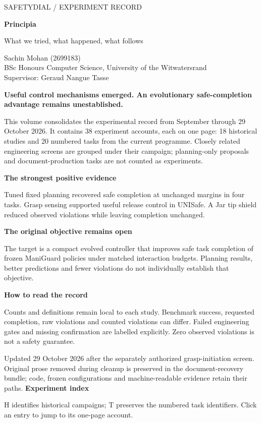 \documentclass[11pt,a4paper]{article}
\newcommand{\block}[2]{\par\textbf{\color{ink}#1}\par\nopagebreak #2\par}
\newcommand{\finding}[1]{\begin{tcolorbox}[colback=pale,colframe=pale,boxrule=0pt,arc=1mm,left=10pt,right=10pt,top=10pt,bottom=10pt]\color{ink}\large\bfseries #1\end{tcolorbox}}
\begin{document}
\thispagestyle{empty}
{\color{accent}\large SAFETYDIAL / EXPERIMENT RECORD}\par
\vspace{13mm}
{\color{ink}\fontsize{44}{48}\selectfont\bfseries Principia}\par
\vspace{3mm}
{\color{ink}\Large What we tried, what happened, what follows}\par
\vspace{8mm}
Sachin Mohan (2699183)\\
BSc Honours Computer Science, University of the Witwatersrand\\
Supervisor: Geraud Nangue Tasse
\vspace{8mm}
\finding{Useful control mechanisms emerged. An evolutionary safe-completion advantage remains unestablished.}
This volume consolidates the experimental record from September through
29 October 2026. It contains 38 experiment accounts, each on one page:
18 historical studies and 20 numbered tasks from the current programme.
Closely related engineering screens are grouped under their campaign; planning-only
proposals and document-production tasks are not counted as experiments.
\block{The strongest positive evidence}{Tuned fixed planning recovered safe completion at unchanged margins in four tasks. Grasp sensing supported useful release control in UNISafe. A Jar tip shield reduced observed violations while leaving completion unchanged.}
\block{The original objective remains open}{The target is a compact evolved controller that improves safe task completion of frozen ManiGuard policies under matched interaction budgets. Planning results, better predictions and fewer violations do not individually establish that objective.}
\block{How to read the record}{Counts and definitions remain local to each study. Benchmark success, requested completion, raw violations and counted violations can differ. Failed engineering gates and missing confirmation are labelled explicitly. Zero observed violations is not a safety guarantee.}
\vfill
{\small\color{muted}Updated 29 October 2026 after the separately authorized grasp-initiation screen. Original prose removed during cleanup is preserved in the document-recovery bundle; code, frozen configurations and machine-readable evidence retain their paths.}
\clearpage
{\color{ink}\LARGE\bfseries Experiment index}\par
\vspace{3mm}
{\small H identifies historical campaigns; T preserves the numbered task identifiers. Click an entry to jump to its one-page account.}
\end{document}
